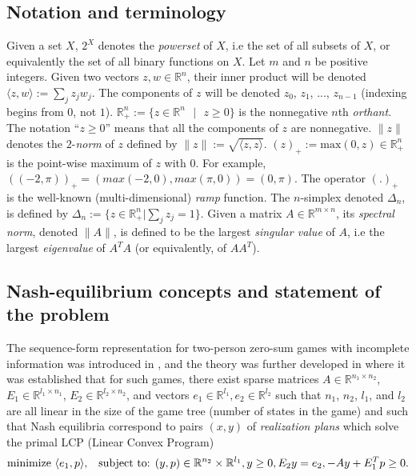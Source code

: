 \documentclass{article} %
\begin{document}
\subsection{Notation and terminology}
Given a set $X$, $2^X$ denotes the \emph{powerset} of $X$, i.e the set
of all subsets of $X$, or equivalently the set of all binary
functions on $X$. Let $m$ and $n$ be positive integers. Given two
vectors $z, w \in \mathbb{R}^n$, their inner product will be denoted
$\langle z, w\rangle := \sum_{j}z_jw_j$. The components of $z$ will be
denoted $z_0$, $z_1$, ..., $z_{n-1}$ (indexing begins from $0$,
not $1$). $\mathbb{R}^{n}_+ := \{z \in \mathbb{R}^{n}\text{ }|\text{ }
z \geq 0\}$ is the nonnegative $n$th \textit{orthant}.
The notation ``$z \ge 0$'' means that all the components of
$z$ are nonnegative.
$\|z\|$ denotes the $2$-\textit{norm} of $z$ defined by $\|z\| :=
\sqrt{\langle z, z\rangle}$. $(z)_+:=\text{max}(0, z) \in
\mathbb{R}^{n}_+$ is the point-wise maximum of $z$ with $0$. For
example, $((-2, \pi))_+ = (max(-2, 0), max(\pi, 0)) = (0, \pi)$. The
operator $(.)_+$ is the well-known (multi-dimensional) \textit{ramp}
function. The $n$-simplex denoted $\Delta_n$, is defined by $\Delta_n
:= \{z \in \mathbb{R}^n_+|\sum_j z_j = 1\}$.
Given a matrix $A \in \mathbb{R}^{m \times n}$, its \textit{spectral
  norm}, denoted $\|A\|$, is
 defined to be the largest \textit{singular value} of $A$, i.e the
 largest \textit{eigenvalue} of $A^TA$ (or equivalently, of $AA^T$).

\subsection{Nash-equilibrium concepts and statement of the problem}
The sequence-form representation for two-person zero-sum games with
incomplete information was introduced in
\cite{koller1992complexity}, and the theory was further developed in
\cite{koller1994fast,von1996efficient,vonequilibrium} where it was
established that for such games, there exist sparse matrices
$A \in \mathbb{R}^{n_1 \times n_2}$, $E_1 \in \mathbb{R}^{l_1 \times
  n_1}$, $E_2 \in \mathbb{R}^{l_2 \times n_2}$, and vectors $e_1 \in
\mathbb{R}^{l_1}, e_2 \in \mathbb{R}^{l_2}$ such that $n_1$, $n_2$,
$l_1$, and $l_2$ are all linear in the size of the game tree (number
of states in the game) and such that Nash equilibria correspond to
pairs $(x, y)$ of \textit{realization plans} which solve the primal
LCP (Linear Convex Program)
\begin{equation}
  \begin{aligned}
     \text{minimize }\langle e_1, p\rangle, \hspace{.5em}\text{
       subject to: }(y,p) \in \mathbb{R}^{n_2} \times
     \mathbb{R}^{l_1},  y \ge 0, E_2y = e_2, -Ay + E_1^Tp \geq 0.
  \end{aligned}
  \label{eq:primal_pb}
\end{equation}
\end{document}
